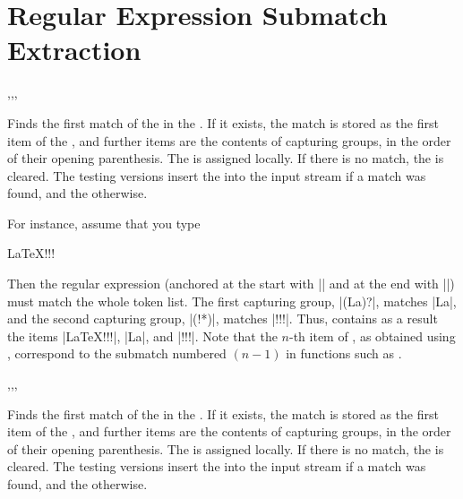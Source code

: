\documentclass[oneside]{book}
\begin{document}
\section{Regular Expression Submatch Extraction}

\begin{function}{\RegexExtractOnce,\RegexExtractOnceT,\RegexExtractOnceF,\RegexExtractOnceTF}
\begin{syntax}
   
    
    
     
\end{syntax}
Finds the first match of the  in the
. If it exists, the match is stored as the first
item of the , and further items are the contents of
capturing groups, in the order of their opening parenthesis. The
 is assigned locally. If there is no match, the
 is cleared.  The testing versions insert the
 into the input stream if a match was found, and the
 otherwise.
\par
For instance, assume that you type
\begin{codehigh}
 {LaTeX!!!} \lTmpaSeq
\end{codehigh}
Then the regular expression (anchored at the start with |\A| and
at the end with |\Z|) must match the whole token list. The first
capturing group, |(La)?|, matches |La|, and the second capturing
group, |(!*)|, matches |!!!|. Thus,  contains as a result
the items |{LaTeX!!!}|, |{La}|, and |{!!!}|.
Note that the $n$-th item of , as obtained using
, correspond to the submatch numbered $(n-1)$ in
functions such as .
\end{function}

\begin{function}{\RegexVarExtractOnce,\RegexVarExtractOnceT,\RegexVarExtractOnceF,\RegexVarExtractOnceTF}
\begin{syntax}
   
    
    
     
\end{syntax}
Finds the first match of the  in the
. If it exists, the match is stored as the first
item of the , and further items are the contents of
capturing groups, in the order of their opening parenthesis. The
 is assigned locally. If there is no match, the
 is cleared.  The testing versions insert the
 into the input stream if a match was found, and the
 otherwise.
\end{function}
\end{document}
